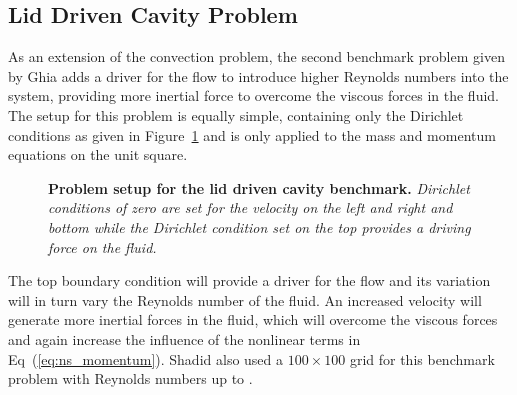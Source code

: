 \subsection{Lid Driven Cavity Problem}
\label{subsec:lid_driven_cavity}
As an extension of the convection problem, the second benchmark
problem given by Ghia \citep{ghia_high-re_1982} adds a driver for the
flow to introduce higher Reynolds numbers into the system, providing
more inertial force to overcome the viscous forces in the fluid. The
setup for this problem is equally simple, containing only the
Dirichlet conditions as given in Figure~\ref{fig:lid_driven_cavity}
and is only applied to the mass and momentum equations on the unit
square.
\begin{figure}[t!]
  \begin{center}
    \scalebox{1.5}{
       }
  \end{center}
  \caption{\textbf{Problem setup for the lid driven cavity benchmark.}
    \textit{Dirichlet conditions of zero are set for the velocity on
      the left and right and bottom while the Dirichlet condition set
      on the top provides a driving force on the fluid.}}
  \label{fig:lid_driven_cavity}
\end{figure}
The top boundary condition will provide a driver for the flow and its
variation will in turn vary the Reynolds number of the fluid. An
increased velocity will generate more inertial forces in the fluid,
which will overcome the viscous forces and again increase the
influence of the nonlinear terms in Eq~(\ref{eq:ns_momentum}). Shadid
also used a $100 \times 100$ grid for this benchmark problem with
Reynolds numbers up to .

